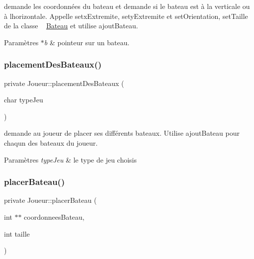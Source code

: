 demande les coordonnées du bateau et demande si le bateau est à la verticale ou à l\textquotesingle{}horizontale. Appelle setx\+Extremite, sety\+Extremite et set\+Orientation, set\+Taille de la classe ~\newline
\mbox{\hyperlink{class_bateau}{Bateau}} et utilise ajout\+Bateau. 


\begin{DoxyParams}{Paramètres}
{\em $\ast$b} & pointeur sur un bateau. \\
\hline
\end{DoxyParams}
\mbox{\label{class_joueur_aa97f71a90328693e0047ba2f48d61b4b}} 
\subsubsection{\texorpdfstring{placement\+Des\+Bateaux()}{placementDesBateaux()}}
{\footnotesize\ttfamily private Joueur\+::placement\+Des\+Bateaux (\begin{DoxyParamCaption}\item[{char}]{type\+Jeu }\end{DoxyParamCaption})}



demande au joueur de placer ses différents bateaux. Utilise ajout\+Bateau pour chaqun des bateaux du joueur. 


\begin{DoxyParams}{Paramètres}
{\em type\+Jeu} & le type de jeu choisis \\
\hline
\end{DoxyParams}
\mbox{\label{class_joueur_ae39058e6dc3daab6fb0377ecda0dfb91}} 
\subsubsection{\texorpdfstring{placer\+Bateau()}{placerBateau()}}
{\footnotesize\ttfamily private Joueur\+::placer\+Bateau (\begin{DoxyParamCaption}\item[{int $\ast$$\ast$}]{coordonnees\+Bateau,  }\item[{int}]{taille }\end{DoxyParamCaption})\hspace{0.3cm}{\ttfamily [private]}}



